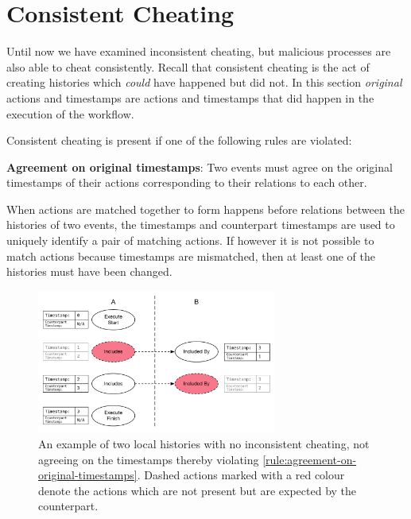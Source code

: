 	\section{Consistent Cheating}
	Until now we have examined inconsistent cheating, but malicious processes are also able to cheat consistently. Recall that consistent cheating is the act of creating histories which \textit{could} have happened but did not. In this section \textit{original} actions and timestamps are actions and timestamps that did happen in the execution of the workflow. 

	\newpar Consistent cheating is present if one of the following rules are violated:

	\begin{ruledef}
		\textbf{Agreement on original timestamps}: Two events must agree on the original timestamps of their actions corresponding to their relations to each other.
		\label{rule:agreement-on-original-timestamps}
	\end{ruledef}
	
	\noindent When actions are matched together to form happens before relations between the histories of two events, the timestamps and counterpart timestamps are used to uniquely identify a pair of matching actions. If however it is not possible to match actions because timestamps are mismatched, then at least one of the histories must have been changed. 
	
	\begin{figure}[H]
		\centering
		\includegraphics[width=0.7\textwidth]{6validation/images/agreement-on-original-timestamps.pdf}
		\caption{An example of two local histories with no inconsistent cheating, not agreeing on the timestamps thereby violating \autoref{rule:agreement-on-original-timestamps}. Dashed actions marked with a red colour denote the actions which are not present but are expected by the counterpart.}
		\label{fig:agreement-on-original-timestamps}
	\end{figure}
	
